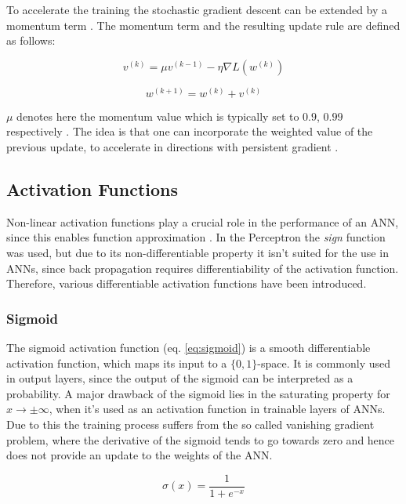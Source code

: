 To accelerate the training the stochastic gradient descent can be extended by a momentum term \cite{sgd_momentum}.
The momentum term and the resulting update rule are defined as follows:

\begin{equation}
    v^{(k)} = \mu v^{(k-1)} - \eta \nabla L(w^{(k)})
\end{equation}

\begin{equation}
    w^{(k+1)} = w^{(k)} + v^{(k)}
\end{equation}

$\mu$ denotes here the momentum value which is typically set to $0.9$, $0.99$ respectively \cite{adam}.
The idea is that one can incorporate the weighted value of the previous update, to accelerate in directions with persistent gradient \cite{dl}.

\subsection{Activation Functions}
\label{sec:activation_functions}

Non-linear activation functions play a crucial role in the performance of an \ac{ANN}, since this enables function approximation \cite{mish}.
In the Perceptron the \textit{sign} function was used, but due to its non-differentiable property it isn't suited for the use in \acp{ANN}, since back propagation requires differentiability of the activation function.
Therefore, various differentiable activation functions have been introduced.

\subsubsection{Sigmoid}

The sigmoid activation function (eq. \ref{eq:sigmoid}) is a smooth differentiable activation function, which maps its input to a $\{0, 1\}$-space.
It is commonly used in output layers, since the output of the sigmoid can be interpreted as a probability.
A major drawback of the sigmoid lies in the saturating property for $x \to \pm \infty$, when it's used as an activation function in trainable layers of \acp{ANN}.
Due to this the training process suffers from the so called vanishing gradient problem, where the derivative of the sigmoid tends to go towards zero and hence does not provide an update to the weights of the \ac{ANN}.

\begin{equation}
    \sigma(x) = \frac{1}{1 + e^{-x}}
    \label{eq:sigmoid}
\end{equation}


